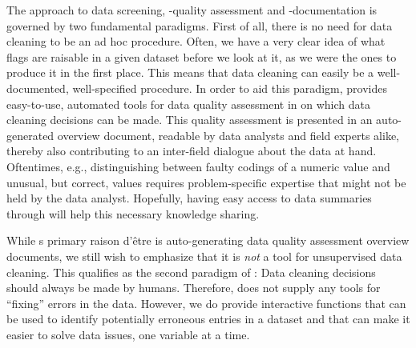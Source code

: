 \documentclass[article,shortnames]{jss}
\begin{document}
The  approach to data screening, -quality assessment and
-documentation is governed by two fundamental paradigms. First of all,
there is no need for data cleaning to be an ad hoc procedure. Often,
we have a very clear idea of what flags are raisable in a given
dataset before we look at it, as we were the ones to produce it in the
first place. This means that data cleaning can easily be a
well-documented, well-specified procedure. In order to aid this
paradigm,  provides easy-to-use, automated tools for
data quality assessment in  \citep{R} on which data
cleaning decisions can be made. This quality assessment is presented
in an auto-generated overview document, readable by data analysts and
field experts alike, thereby also contributing to an inter-field
dialogue about the data at hand. Oftentimes, e.g., distinguishing
between faulty codings of a numeric value and unusual, but correct,
values requires problem-specific expertise that might not be held by
the data analyst. Hopefully, having easy access to data summaries
through  will help this necessary knowledge sharing.

While s primary raison d'être is auto-generating data
quality assessment overview documents, we still wish to emphasize that
it is \emph{not} a tool for unsupervised data cleaning. This qualifies
as the second paradigm of : Data cleaning decisions
should always be made by humans. Therefore,  does not
supply any tools for ``fixing'' errors in the data. However, we do
provide interactive functions that can be used to identify potentially
erroneous entries in a dataset and that can make it easier to solve
data issues, one variable at a time.
\end{document}
